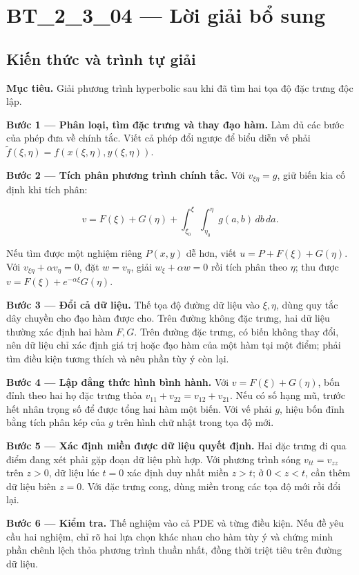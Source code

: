 \documentclass[10pt,a4paper]{article}
\begin{document}
\section*{BT\_2\_3\_04 — Lời giải bổ sung}
\subsection*{Kiến thức và trình tự giải}
\textbf{Mục tiêu.} Giải phương trình hyperbolic sau khi đã tìm hai tọa độ đặc trưng độc lập.

\textbf{Bước 1 — Phân loại, tìm đặc trưng và thay đạo hàm.} Làm đủ các bước của phép đưa về chính tắc. Viết cả phép đổi ngược để biểu diễn vế phải $\widetilde f(\xi,\eta)=f(x(\xi,\eta),y(\xi,\eta))$.

\textbf{Bước 2 — Tích phân phương trình chính tắc.} Với $v_{\xi\eta}=g$, giữ biến kia cố định khi tích phân:


\[
v=F(\xi)+G(\eta)+\int_{\xi_0}^{\xi}\int_{\eta_0}^{\eta}g(a,b)\,db\,da.
\]


Nếu tìm được một nghiệm riêng $P(x,y)$ dễ hơn, viết $u=P+F(\xi)+G(\eta)$. Với $v_{\xi\eta}+\alpha v_\eta=0$, đặt $w=v_\eta$, giải $w_\xi+\alpha w=0$ rồi tích phân theo $\eta$; thu được $v=F(\xi)+e^{-\alpha\xi}G(\eta)$.

\textbf{Bước 3 — Đổi cả dữ liệu.} Thế tọa độ đường dữ liệu vào $\xi,\eta$, dùng quy tắc dây chuyền cho đạo hàm được cho. Trên đường không đặc trưng, hai dữ liệu thường xác định hai hàm $F,G$. Trên đường đặc trưng, có biến không thay đổi, nên dữ liệu chỉ xác định giá trị hoặc đạo hàm của một hàm tại một điểm; phải tìm điều kiện tương thích và nêu phần tùy ý còn lại.

\textbf{Bước 4 — Lập đẳng thức hình bình hành.} Với $v=F(\xi)+G(\eta)$, bốn đỉnh theo hai họ đặc trưng thỏa $v_{11}+v_{22}=v_{12}+v_{21}$. Nếu có số hạng mũ, trước hết nhân trọng số để được tổng hai hàm một biến. Với vế phải $g$, hiệu bốn đỉnh bằng tích phân kép của $g$ trên hình chữ nhật trong tọa độ mới.

\textbf{Bước 5 — Xác định miền được dữ liệu quyết định.} Hai đặc trưng đi qua điểm đang xét phải gặp đoạn dữ liệu phù hợp. Với phương trình sóng $v_{tt}=v_{zz}$ trên $z>0$, dữ liệu lúc $t=0$ xác định duy nhất miền $z>t$; ở $0<z<t$, cần thêm dữ liệu biên $z=0$. Với đặc trưng cong, dùng miền trong các tọa độ mới rồi đổi lại.

\textbf{Bước 6 — Kiểm tra.} Thế nghiệm vào cả PDE và từng điều kiện. Nếu đề yêu cầu hai nghiệm, chỉ rõ hai lựa chọn khác nhau cho hàm tùy ý và chứng minh phần chênh lệch thỏa phương trình thuần nhất, đồng thời triệt tiêu trên đường dữ liệu.
\end{document}
